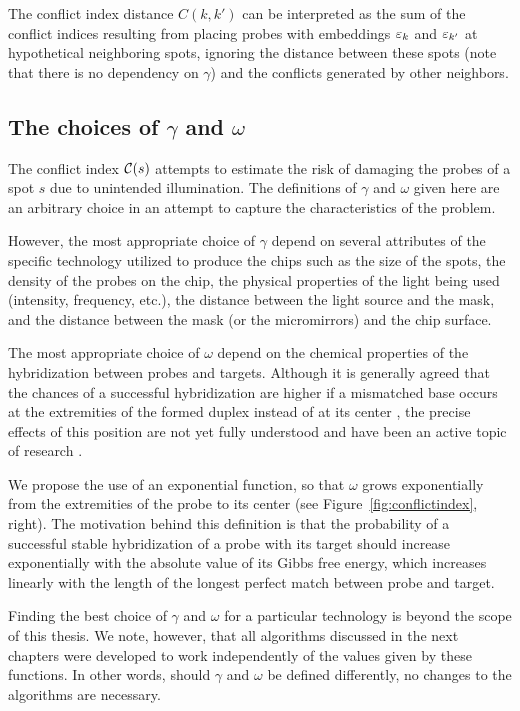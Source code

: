 The conflict index distance $C(k,k')$ can be interpreted as the sum of the
conflict indices resulting from placing probes with embeddings $\varepsilon_k$ and
$\varepsilon_{k'}$ at hypothetical neighboring spots, ignoring the distance between
these spots (note that there is no dependency on $\gamma$) and the conflicts
generated by other neighbors.

\subsection{The choices of $\gamma$ and $\omega$}

The conflict index ${\mathcal{C}}(s)$ attempts to estimate the risk of damaging the
probes of a spot $s$ due to unintended illumination. The definitions of $\gamma$
and $\omega$ given here are an arbitrary choice in an attempt to capture the
characteristics of the problem.

However, the most appropriate choice of $\gamma$ depend on several attributes of
the specific technology utilized to produce the chips such as the size of the
spots, the density of the probes on the chip, the physical properties of the
light being used (intensity, frequency, etc.), the distance between the light
source and the mask, and the distance between the mask (or the micromirrors) and
the chip surface.

The most appropriate choice of $\omega$ depend on the chemical properties of the
hybridization between probes and targets. Although it is generally agreed that
the chances of a successful hybridization are higher if a mismatched base occurs
at the extremities of the formed duplex instead of at its center
\citep{Hubbell1999,Southern1999,Guo1997}, the precise effects of this position
are not yet fully understood and have been an active topic of research
\citep{Binder2004,Binder2005}.

We propose the use of an exponential function, so that $\omega$ grows
exponentially from the extremities of the probe to its center (see
Figure~\ref{fig:conflictindex}, right). The motivation behind this definition is
that the probability of a successful stable hybridization of a probe with its
target should increase exponentially with the absolute value of its Gibbs free
energy, which increases linearly with the length of the longest perfect match
between probe and target.

Finding the best choice of $\gamma$ and $\omega$ for a particular technology is
beyond the scope of this thesis. We note, however, that all algorithms discussed
in the next chapters were developed to work independently of the values given by
these functions. In other words, should $\gamma$ and $\omega$ be defined
differently, no changes to the algorithms are necessary.

